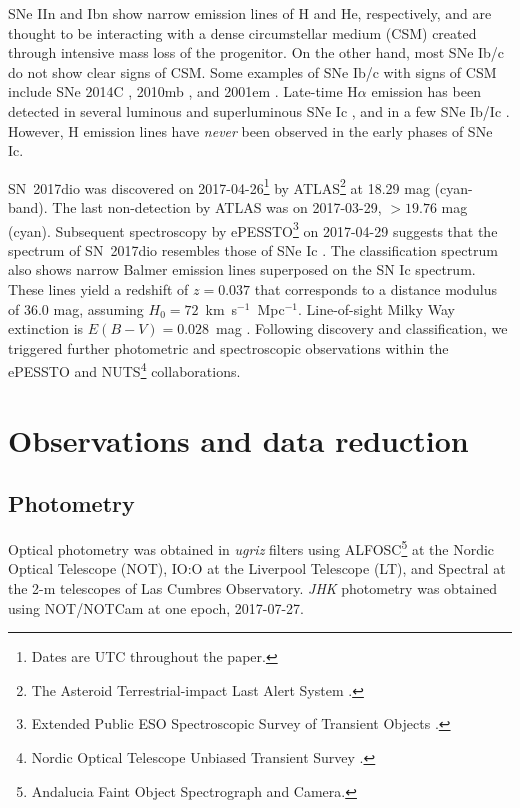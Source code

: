 \documentclass[twocolumn]{aastex61}
\begin{document}
SNe IIn \citep{schlegel90} and Ibn \citep{pastorello07} show narrow emission lines of H and He, respectively, and are thought to be interacting with a dense circumstellar medium (CSM) created through intensive mass loss of the progenitor. 
{On the other hand, most SNe Ib/c do not show clear signs of CSM}. 
Some {examples} of {SNe Ib/c with signs of CSM} include SNe 2014C \citep{milisav15}, 2010mb \citep{benami14}, and 2001em \citep{chugai06}. 
Late-time H$\alpha$ emission has been detected in several {luminous \citep{roy16} and superluminous SNe Ic \citep{yan17}}, and in a few SNe Ib/Ic \citep{vinko17}.
However, H emission lines have \emph{never} been observed in the early phases of SNe Ic.

SN~2017dio was discovered on 2017-04-26\footnote{Dates are UTC throughout the paper.} by ATLAS\footnote{The Asteroid Terrestrial-impact Last Alert System \citep{tonry11}.} at 18.29 mag (cyan-band). The last non-detection by ATLAS was on 2017-03-29, $>19.76$ mag (cyan).
Subsequent spectroscopy by ePESSTO\footnote{Extended Public ESO Spectroscopic Survey of Transient Objects \citep{smartt15}.} on 2017-04-29 suggests that the spectrum of SN~2017dio resembles those of SNe Ic \citep{cartier17}. The classification spectrum also shows narrow Balmer emission lines superposed on the SN Ic spectrum. 
These lines yield a redshift of $z = 0.037$ that corresponds to a {distance modulus of 36.0 mag, assuming $H_0 = 72$~km~s$^{-1}$~Mpc$^{-1}$}. 
Line-of-sight Milky Way extinction is $E(B-V) = 0.028$~mag \citep{schlafly11}.
Following discovery and classification, we triggered further photometric and spectroscopic observations within the ePESSTO and NUTS\footnote{Nordic Optical Telescope Unbiased Transient Survey \citep{mattila16}.} collaborations.

\section{Observations and data reduction}
\subsection{Photometry}
Optical photometry was obtained in \textit{ugriz} filters using ALFOSC\footnote{Andalucia Faint Object Spectrograph and Camera.} at the Nordic Optical Telescope (NOT), IO:O at the Liverpool Telescope (LT), and Spectral at the 2-m telescopes of Las Cumbres Observatory. 
{\textit{JHK} photometry was obtained using NOT/NOTCam at one epoch, 2017-07-27.}
\end{document}
